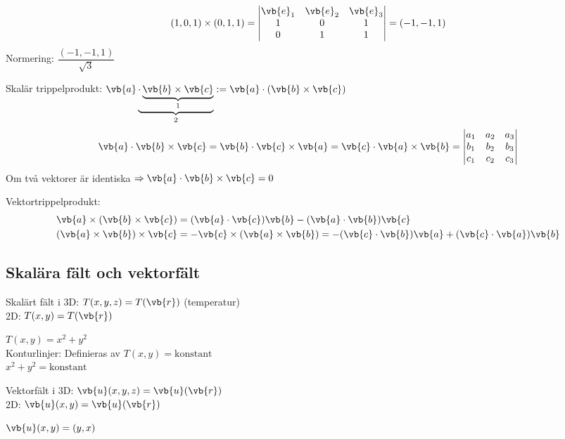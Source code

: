 \begin{example}[1.7 (forts.)]
\[ (1, 0, 1) \times (0, 1, 1) = \begin{vmatrix} \vb{e}_1 & \vb{e}_2 & \vb{e}_3 \\ 1 & 0 & 1 \\ 0 & 1 & 1 \end{vmatrix} = (-1, -1, 1) \]
Normering: $\dfrac{(-1, -1, 1)}{\sqrt{3}}$
\end{example}

Skalär trippelprodukt: $\vb{a} \underbrace{\cdot \underbrace{\vb{b} \times \vb{c}}_{1}}_{2} := \vb{a} \cdot (\vb{b} \times \vb{c})$
\[ \vb{a} \cdot \vb{b} \times \vb{c} = \vb{b} \cdot \vb{c} \times \vb{a} = \vb{c} \cdot \vb{a} \times \vb{b} = \begin{vmatrix} a_1 & a_2 & a_3 \\ b_1 & b_2 & b_3 \\ c_1 & c_2 & c_3 \end{vmatrix} \]
Om två vektorer är identiska $\Rightarrow \vb{a} \cdot \vb{b} \times \vb{c} = 0$

Vektortrippelprodukt:
\begin{align*}
\vb{a} \times (\vb{b} \times \vb{c}) &= (\vb{a} \cdot \vb{c})\vb{b} - (\vb{a} \cdot \vb{b})\vb{c} \\
(\vb{a} \times \vb{b}) \times \vb{c} &= -\vb{c} \times (\vb{a} \times \vb{b}) = -(\vb{c} \cdot \vb{b})\vb{a} + (\vb{c} \cdot \vb{a})\vb{b}
\end{align*}

\subsection{Skalära fält och vektorfält}
Skalärt fält i 3D: $T(x, y, z) = T(\vb{r})$ \qquad (temperatur)\\
\phantom{Skalärt fält i }2D: $T(x, y) = T(\vb{r})$

\begin{example}
$T(x, y) = x^2 + y^2$\\
Konturlinjer: Definieras av $T(x, y) = \text{konstant}$\\
\phantom{Konturlinjer: Definieras av }$x^2 + y^2 = \text{konstant}$
\end{example}

Vektorfält i 3D: $\vb{u}(x, y, z) = \vb{u}(\vb{r})$\\
\phantom{Vektorfält i }2D: $\vb{u}(x, y) = \vb{u}(\vb{r})$

\begin{example}
$\vb{u}(x, y) = (y, x)$
\end{example}
